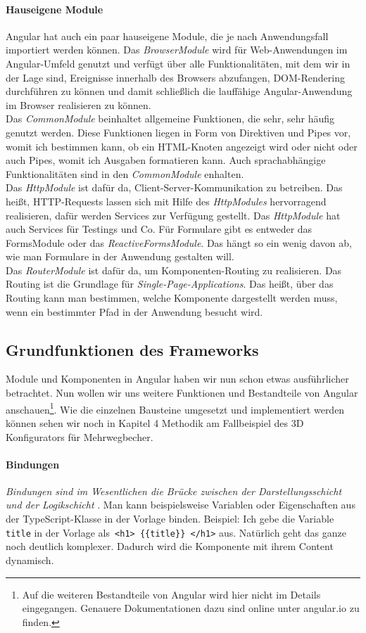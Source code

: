 \paragraph{Hauseigene Module}
Angular hat auch ein paar hauseigene Module, die je nach Anwendungsfall importiert werden können. Das \textit{BrowserModule} wird für Web-Anwendungen im Angular-Umfeld genutzt und verfügt über alle Funktionalitäten, mit dem wir in der Lage sind, Ereignisse innerhalb des Browsers abzufangen, DOM-Rendering durchführen zu können und damit schließlich die lauffähige Angular-Anwendung im Browser realisieren zu können.\\
Das \textit{CommonModule} beinhaltet allgemeine Funktionen, die sehr, sehr häufig genutzt werden. Diese Funktionen liegen in Form von Direktiven und Pipes vor, womit ich bestimmen kann, ob ein HTML-Knoten angezeigt wird oder nicht oder auch Pipes, womit ich Ausgaben formatieren kann. Auch sprachabhängige Funktionalitäten sind in den \textit{CommonModule} enhalten.\\
Das \textit{HttpModule} ist dafür da, Client-Server-Kommunikation zu betreiben. Das heißt, HTTP-Requests lassen sich mit Hilfe des \textit{HttpModules} hervorragend realisieren, dafür werden Services zur Verfügung gestellt. Das \textit{HttpModule} hat auch Services für Testings und Co. Für Formulare gibt es entweder das FormsModule oder das \textit{ReactiveFormsModule}. Das hängt so ein wenig davon ab, wie man Formulare in der Anwendung gestalten will.\\
Das \textit{RouterModule} ist dafür da, um Komponenten-Routing zu realisieren. Das Routing ist die Grundlage für \textit{Single-Page-Applications}. Das heißt, über das Routing kann man bestimmen, welche Komponente dargestellt werden muss, wenn ein bestimmter Pfad in der Anwendung besucht wird.
%
\subsection{Grundfunktionen des Frameworks}
\label{subsec:grundfunktionen}
%
Module und Komponenten in Angular haben wir nun schon etwas ausführlicher betrachtet. Nun wollen wir uns weitere Funktionen und Bestandteile von Angular anschauen\footnote{Auf die weiteren Bestandteile von Angular wird hier nicht im Details eingegangen. Genauere Dokumentationen dazu sind online unter angular.io zu finden.}. Wie die einzelnen Bausteine umgesetzt und implementiert werden können sehen wir noch in Kapitel 4 Methodik am Fallbeispiel des 3D Konfigurators für Mehrwegbecher.
%
\paragraph{Bindungen}
%
\textit{\glqq Bindungen sind im Wesentlichen die Brücke zwischen der Darstellungsschicht und der Logikschicht\grqq } \cite{unlu_angular_2018}. Man kann beispielsweise Variablen oder Eigenschaften aus der TypeScript-Klasse in der Vorlage binden. Beispiel: Ich gebe die Variable \texttt{title} in der Vorlage als\texttt{ <h1> \{\{title\}\} </h1>} aus. Natürlich geht das ganze noch deutlich komplexer. Dadurch wird die Komponente mit ihrem Content dynamisch.
%
